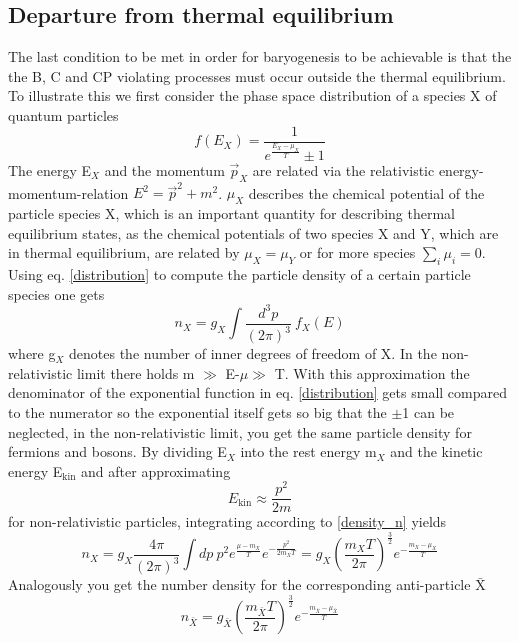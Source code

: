 \subsection{Departure from thermal equilibrium}
The last condition to be met in order for baryogenesis to be achievable is that the the B, C and CP violating processes must occur outside the thermal equilibrium. To illustrate this we first consider the phase space distribution of a species X of quantum particles
\begin{equation}
	f(E_X)=\frac{1}{e^{\frac{E_X-\mu_X}{T}}\pm1}
	\label{distribution}
\end{equation}
The energy E$_X$ and the momentum $\vec{p}_X$ are related via the relativistic energy-momentum-relation $E^2=\vec{p}^2+m^2$. $\mu_X$ describes the chemical potential of the particle species X, which is an important quantity for describing thermal equilibrium states, as the chemical potentials of two species X and Y, which are in thermal equilibrium, are related by $\mu_X=\mu_Y$ or for more species $\sum_i\mu_i=0$.\newline
Using eq. \ref{distribution} to compute the particle density of a certain particle species one gets 
\begin{equation}
	n_X=g_X\int\frac{d^3p}{(2\pi)^3}\:f_X(E)
	\label{density_n}
\end{equation}
where g$_X$ denotes the number of inner degrees of freedom of X. \newline
In the non-relativistic limit there holds m $\gg$ E-$\mu\gg$ T. With this approximation the denominator of the exponential function in eq. \ref{distribution} gets small compared to the numerator so the exponential itself gets so big that the $\pm$1 can be neglected, in the non-relativistic limit, you get the same particle density for fermions and bosons. By dividing E$_X$ into the rest energy m$_X$ and the kinetic energy E$_{\text{kin}}$ and after approximating
\begin{equation}
	E_{\text{kin}}\approx\frac{p^2}{2m}
\end{equation}
for non-relativistic particles, integrating according to \ref{density_n} yields
\begin{equation}
n_X=g_X\frac{4\pi}{(2\pi)^3}\int dp\:p^2e^\frac{\mu-m_X}{T}e^{-\frac{p^2}{2m_XT}}=g_X\left(\frac{m_XT}{2\pi}\right)^\frac{3}{2}e^{-\frac{m_X-\mu_X}{T}}
\label{numerX}
\end{equation}
Analogously you get the number density for the corresponding anti-particle $\bar{\text{X}}$
\begin{equation}
	n_{\bar{X}}=g_{\bar{X}}\left(\frac{m_{\bar{X}}T}{2\pi}\right)^\frac{3}{2}e^{-\frac{m_{\bar{X}}-\mu_{\bar{X}}}{T}}
\label{numberantiX}
\end{equation}
